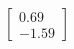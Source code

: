 \documentclass[preview]{standalone}
\begin{document}
\begin{align*}
\begin{bmatrix} 0.69 \\ -1.59 \end{bmatrix}
\end{align*}
\end{document}
